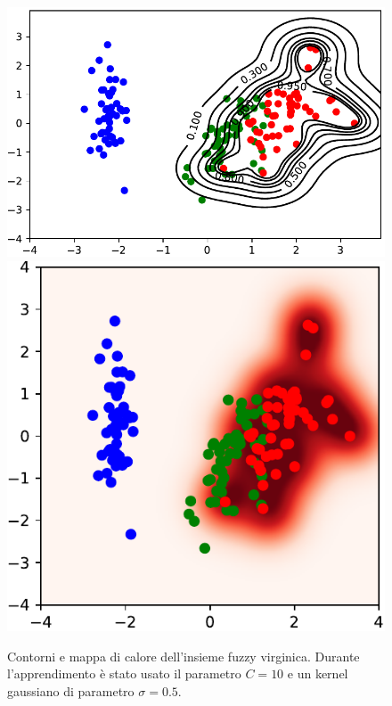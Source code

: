 \documentclass [11pt,a4paper,twoside,openright] {book}
\begin{document}
\begin{figure}[!h]
        \centering%
        \subfigure
          {\includegraphics[scale=.5]{figure/virginicamap.pdf}}\qquad\qquad
       \subfigure
          {\includegraphics[scale=.5]{figure/virginicaheat.pdf}}
          \caption{Contorni e mappa di calore dell'insieme fuzzy virginica. Durante l'apprendimento è stato usato il parametro $C=10$ e un kernel gaussiano di parametro $\sigma=0.5$.\label{fuzzyvirginica}}
\end{figure}
\end{document}
